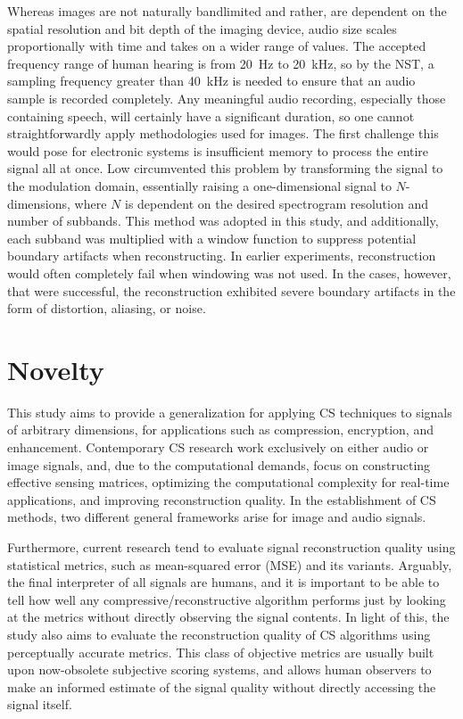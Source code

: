 Whereas images are not naturally bandlimited and rather, are dependent on the spatial resolution and bit depth of the imaging device, audio size scales proportionally with time and takes on a wider range of values. The accepted frequency range of human hearing is from 20~Hz to 20~kHz, so by the NST, a sampling frequency greater than 40~kHz is needed to ensure that an audio sample is recorded completely. Any meaningful audio recording, especially those containing speech, will certainly have a significant duration, so one cannot straightforwardly apply methodologies used for images. The first challenge this would pose for electronic systems is insufficient memory to process the entire signal all at once. Low circumvented this problem \cite{Low2013,Low2018} by transforming the signal to the modulation domain, essentially raising a one-dimensional signal to $N$-dimensions, where $N$ is dependent on the desired spectrogram resolution and number of subbands. This method was adopted in this study, and additionally, each subband was multiplied with a window function to suppress potential boundary artifacts when reconstructing. In earlier experiments, reconstruction would often completely fail when windowing was not used. In the cases, however, that were successful, the reconstruction exhibited severe boundary artifacts in the form of distortion, aliasing, or noise.


\section{Novelty}
\label{sec:novel}
This study aims to provide a generalization for applying CS techniques to signals of arbitrary dimensions, for applications such as compression, encryption, and enhancement. Contemporary CS research work exclusively on either audio or image signals, and, due to the computational demands, focus on constructing effective sensing matrices, optimizing the computational complexity for real-time applications, and improving reconstruction quality. In the establishment of CS methods, two different general frameworks arise for image and audio signals.

Furthermore, current research tend to evaluate signal reconstruction quality using statistical metrics, such as mean-squared error (MSE) and its variants. Arguably, the final interpreter of all signals are humans, and it is important to be able to tell how well any compressive/reconstructive algorithm performs just by looking at the metrics without directly observing the signal contents. In light of this, the study also aims to evaluate the reconstruction quality of CS algorithms using perceptually accurate metrics. This class of objective metrics are usually built upon now-obsolete subjective scoring systems, and allows human observers to make an informed estimate of the signal quality without directly accessing the signal itself.

